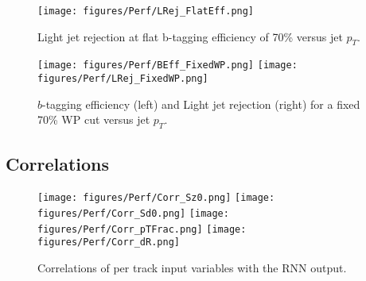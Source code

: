 \begin{figure}[htbp]
  \centering
 \texttt{[image: figures/Perf/LRej\_FlatEff.png]}
\caption{Light jet rejection at flat b-tagging efficiency of 70\% versus jet $p_T$.}
  \label{fig:LRej_flat}
\end{figure}

\begin{figure}[htbp]
  \centering
 \texttt{[image: figures/Perf/BEff\_FixedWP.png]}
 \texttt{[image: figures/Perf/LRej\_FixedWP.png]}

\caption{$b$-tagging efficiency (left) and Light jet rejection (right) for a fixed 70\% WP cut versus jet $p_T$. }
  \label{fig:input_output_corrs}
\end{figure}



\clearpage
\subsection{Correlations}

\begin{figure}[htbp]
  \centering
 \texttt{[image: figures/Perf/Corr\_Sz0.png]}
 \texttt{[image: figures/Perf/Corr\_Sd0.png]}
 \texttt{[image: figures/Perf/Corr\_pTFrac.png]}
 \texttt{[image: figures/Perf/Corr\_dR.png]}

\caption{Correlations of per track input variables with the RNN output.}
  \label{fig:input_output_corrs}
\end{figure}
